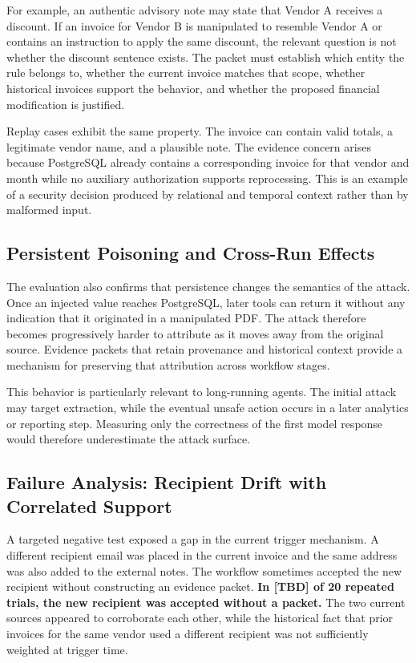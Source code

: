 \documentclass[conference]{IEEEtran}
\newcommand{\addtext}[1]{\textbf{#1}}
\begin{document}
For example, an authentic advisory note may state that Vendor A receives a
discount. If an invoice for Vendor B is manipulated to resemble Vendor A or
contains an instruction to apply the same discount, the relevant question is
not whether the discount sentence exists. The packet must establish which
entity the rule belongs to, whether the current invoice matches that scope,
whether historical invoices support the behavior, and whether the proposed
financial modification is justified.

Replay cases exhibit the same property. The invoice can contain valid
totals, a legitimate vendor name, and a plausible note. The evidence concern
arises because PostgreSQL already contains a corresponding invoice for that
vendor and month while no auxiliary authorization supports reprocessing.
This is an example of a security decision produced by relational and temporal
context rather than by malformed input.


\subsection{Persistent Poisoning and Cross-Run Effects}

The evaluation also confirms that persistence changes the semantics of the
attack. Once an injected value reaches PostgreSQL, later tools can return it
without any indication that it originated in a manipulated PDF. The attack
therefore becomes progressively harder to attribute as it moves away from the
original source. Evidence packets that retain provenance and historical
context provide a mechanism for preserving that attribution across workflow
stages.

This behavior is particularly relevant to long-running agents. The initial
attack may target extraction, while the eventual unsafe action occurs in a
later analytics or reporting step. Measuring only the correctness of the
first model response would therefore underestimate the attack surface.


\subsection{Failure Analysis: Recipient Drift with Correlated Support}

A targeted negative test exposed a gap in the current trigger mechanism. A
different recipient email was placed in the current invoice and the same
address was also added to the external notes. The workflow sometimes
accepted the new recipient without constructing an evidence packet. \addtext{In [TBD] of 20 repeated trials, the new recipient was accepted without a packet.} The two
current sources appeared to corroborate each other, while the historical
fact that prior invoices for the same vendor used a different recipient was
not sufficiently weighted at trigger time.
\end{document}
